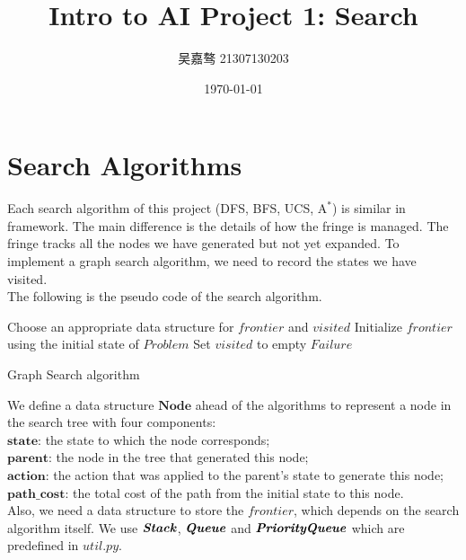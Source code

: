 \documentclass[UTF8]{ctexart}
\title{\textbf{Intro to AI Project 1: Search}}
\author{吴嘉骜 21307130203}
\date{\today}
\begin{document}
\maketitle


\section{Search Algorithms}
\setlength{\parindent}{0pt}
Each search algorithm of this project (DFS, BFS, UCS, $\text{A}^*$) is similar in framework. 
The main difference is the details of how the fringe is managed. The fringe tracks all the nodes we have generated but not yet expanded.
To implement a graph search algorithm, we need to record the states we have visited.\\
The following is the pseudo code of the search algorithm.\\
\begin{algorithm}[H]
  \DontPrintSemicolon
    \SetAlgoLined
    Choose an appropriate data structure for $frontier$ and $visited$\;
    Initialize $frontier$ using the initial state of $Problem$\;
    Set $visited$ to empty\;
    \Return $Failure$ \;
    \caption{Graph Search algorithm}
  \end{algorithm}
We define a data structure $\textbf{Node}$ ahead of the algorithms to represent a node in the search tree with four components:\\
$\textbf{state}$: the state to which the node corresponds;\\
$\textbf{parent}$: the node in the tree that generated this node;\\
$\textbf{action}$: the action that was applied to the parent's state to generate this node;\\
$\textbf{path\_cost}$: the total cost of the path from the initial state to this node.\\
Also, we need a data structure to store the $frontier$, which depends on the search algorithm itself. We use $\textbf{\textit{Stack}}$, $\textbf{\textit{Queue}}$ and $\textbf{\textit{PriorityQueue}}$ which are predefined in $util.py$.\\
\end{document}
